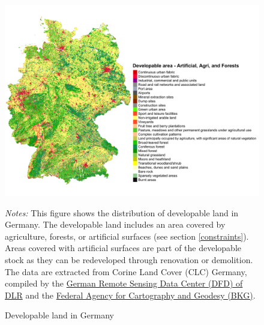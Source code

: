 \documentclass[
  12pt,
]{article}
\begin{document}
\begin{figure}[H]
\centering

\begin{center}\includegraphics[width=1\linewidth]{output/figs/developable-land} \end{center}

\caption{Developable land in Germany}
\medskip
\begin{minipage}{0.9\textwidth}
\footnotesize
\textit{Notes:} This figure shows the distribution of developable land in Germany. The developable land includes an area covered by agriculture, forests, or artificial surfaces (see section \ref{constraints}). Areas covered with artificial surfaces are part of the developable stock as they can be redeveloped through renovation or demolition. 
The data are extracted from Corine Land Cover (CLC) Germany, compiled by the \hyperlink{https://www.dlr.de/eoc/en/desktopdefault.aspx/tabid-11882/20871_read-48836}{German Remote Sensing Data Center (DFD) of DLR} and the \hyperlink{https://www.bkg.bund.de}{Federal Agency for Cartography and Geodesy (BKG)}.
\end{minipage}
\end{figure}
\end{document}
